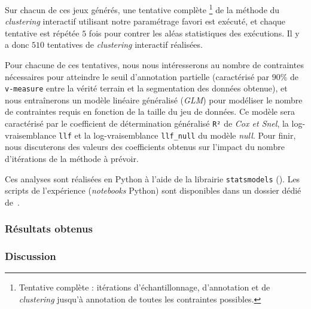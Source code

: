 			Sur chacun de ces jeux générés, une tentative complète
			\footnote{Tentative complète : itérations d'échantillonnage, d'annotation et de \textit{clustering} jusqu'à annotation de toutes les contraintes possibles.}
			de la méthode du \textit{clustering} interactif utilisant notre paramétrage favori est exécuté, et chaque tentative est répétée $5$ fois pour contrer les aléas statistiques des exécutions.
			Il y a donc $510$ tentatives de \textit{clustering} interactif réalisées.
			
			Pour chacune de ces tentatives, nous nous intéresserons au nombre de contraintes nécessaires pour atteindre le seuil d'annotation partielle (caractérisé par $90$\% de \texttt{v-measure} entre la vérité terrain et la segmentation des données obtenue), et nous entraînerons un modèle linéaire généralisé (\textit{GLM}) pour modéliser le nombre de contraintes requis en fonction de la taille du jeu de données.
			Ce modèle sera caractérisé par le coefficient de détermination généralisé \texttt{R²} de \textit{Cox et Snel}, la log-vraisemblance \texttt{llf} et la log-vraisemblance \texttt{llf\_null} du modèle \textit{null}.
			Pour finir, nous discuterons des valeurs des coefficients obtenus sur l'impact du nombre d'itérations de la méthode à prévoir.

			\begin{leftBarInformation}
				Ces analyses sont réalisées en Python à l'aide de la librairie \texttt{statsmodels} (\cite{seabold:2010}).
				Les scripts de l'expérience (\textit{notebooks} Python) sont disponibles dans un dossier dédié de~\cite{schild:cognitivefactory-interactive-clustering-comparative-study:2021}.
			\end{leftBarInformation}

		\subsubsection{Résultats obtenus}
		

		\subsubsection{Discussion}
		
